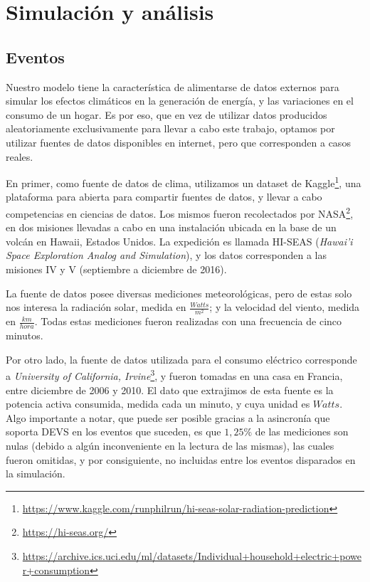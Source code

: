
\section{Simulación y análisis}

\subsection{Eventos} Nuestro modelo tiene la característica de alimentarse de
datos externos para simular los efectos climáticos en la generación de
energía, y las variaciones en el consumo de un hogar. Es por eso, que en vez
de utilizar datos producidos aleatoriamente exclusivamente para llevar a cabo
este trabajo, optamos por utilizar fuentes de datos disponibles en internet,
pero que corresponden a casos reales.

En primer, como fuente de datos de clima, utilizamos un dataset de
Kaggle\footnote{\url{https://www.kaggle.com/runphilrun/hi-seas-solar-radiation-prediction}},
una plataforma para abierta para compartir fuentes de datos, y llevar a cabo
competencias en ciencias de datos. Los mismos fueron recolectados por
NASA\footnote{\url{https://hi-seas.org/}}, en dos misiones llevadas a cabo en
una instalación ubicada en la base de un volcán en Hawaii, Estados Unidos. La
expedición es llamada HI-SEAS (\textit{Hawai’i Space Exploration Analog and
Simulation}), y los datos corresponden a las misiones IV y V (septiembre a
diciembre de 2016).

La fuente de datos posee diversas mediciones meteorológicas, pero de estas
solo nos interesa la radiación solar, medida en $\frac{Watts}{m^2}$; y la
velocidad del viento, medida en $\frac{km}{hora}$. Todas estas mediciones
fueron realizadas con una frecuencia de cinco minutos.

Por otro lado, la fuente de datos utilizada para el consumo eléctrico
corresponde a \textit{University of California,
Irvine}\footnote{\url{https://archive.ics.uci.edu/ml/datasets/Individual+household+electric+power+consumption}},
y fueron tomadas en una casa en Francia, entre diciembre de 2006 y 2010. El
dato que extrajimos de esta fuente es la potencia activa consumida, medida
cada un minuto, y cuya unidad es $Watts$. Algo importante a notar, que puede
ser posible gracias a la asincronía que soporta DEVS en los eventos que
suceden, es que $1,25\%$ de las mediciones son nulas (debido a algún
inconveniente en la lectura de las mismas), las cuales fueron omitidas, y por
consiguiente, no incluidas entre los eventos disparados en la simulación.

